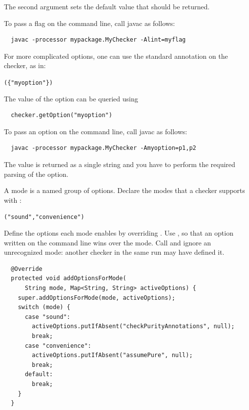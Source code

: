 The second argument sets the default value that should be returned.

To pass a flag on the command line, call javac as follows:

\begin{Verbatim}
  javac -processor mypackage.MyChecker -Alint=myflag
\end{Verbatim}



For more complicated options, one can use the standard
 annotation on the checker, as in:

\begin{alltt}
  (\{"myoption"\})
\end{alltt}

The value of the option can be queried using

\begin{Verbatim}
  checker.getOption("myoption")
\end{Verbatim}

To pass an option on the command line, call javac as follows:

\begin{Verbatim}
  javac -processor mypackage.MyChecker -Amyoption=p1,p2
\end{Verbatim}

The value is returned as a single string and you have to perform the
required parsing of the option.



A mode is a named group of options.  Declare the modes that a checker supports with
:

\begin{alltt}
  ({"sound", "convenience"})
\end{alltt}

Define the options each mode enables by overriding .  Use
, so that an option written on the command line wins over the mode.
Call  and ignore an unrecognized mode:  another checker in the same run
may have defined it.


\begin{Verbatim}
  @Override
  protected void addOptionsForMode(
      String mode, Map<String, String> activeOptions) {
    super.addOptionsForMode(mode, activeOptions);
    switch (mode) {
      case "sound":
        activeOptions.putIfAbsent("checkPurityAnnotations", null);
        break;
      case "convenience":
        activeOptions.putIfAbsent("assumePure", null);
        break;
      default:
        break;
    }
  }
\end{Verbatim}

